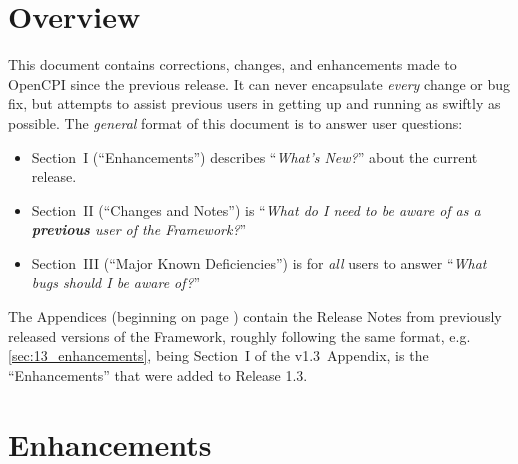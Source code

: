 \section*{Overview}
This document contains corrections, changes, and enhancements made to OpenCPI since the previous release. It can never encapsulate \textit{every} change or bug fix, but attempts to assist previous users in getting up and running as swiftly as possible. The \textit{general} format of this document is to answer user questions:
\begin{itemize}
\item Section~I (``Enhancements'') describes ``\textit{What's New?}'' about the current release.
\item Section~II (``Changes and Notes'') is ``\textit{What do I need to be aware of as a \textbf{previous} user of the Framework?}''
\item Section~III (``Major Known Deficiencies'') is for \textit{all} users to answer ``\textit{What bugs should I be aware of?}''
\end{itemize}
The Appendices (beginning on page \pageref{old_releases}) contain the Release Notes from previously released versions of the Framework, roughly following the same format, e.g. \ref{sec:13_enhancements}, being Section~I of the v1.3~Appendix, is the ``Enhancements'' that were added to Release 1.3.

\def\ocpiversion{latest}  %
\section{Enhancements}

